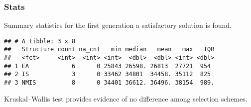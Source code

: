 \documentclass[]{book}
\newenvironment{Shaded}{\begin{snugshade}}{\end{snugshade}}
\newcommand{\CharTok}[1]{\textcolor[rgb]{0.31,0.60,0.02}{#1}}
\newcommand{\DataTypeTok}[1]{\textcolor[rgb]{0.13,0.29,0.53}{#1}}
\newcommand{\DecValTok}[1]{\textcolor[rgb]{0.00,0.00,0.81}{#1}}
\newcommand{\KeywordTok}[1]{\textcolor[rgb]{0.13,0.29,0.53}{\textbf{#1}}}
\newcommand{\NormalTok}[1]{#1}
\newcommand{\OperatorTok}[1]{\textcolor[rgb]{0.81,0.36,0.00}{\textbf{#1}}}
\newcommand{\OtherTok}[1]{\textcolor[rgb]{0.56,0.35,0.01}{#1}}
\newcommand{\StringTok}[1]{\textcolor[rgb]{0.31,0.60,0.02}{#1}}
\begin{document}
\hypertarget{stats-23}{%
\subsubsection{Stats}\label{stats-23}}

Summary statistics for the first generation a satisfactory solution is found.

\begin{Shaded}
\end{Shaded}

\begin{verbatim}
## # A tibble: 3 x 8
##   Structure count na_cnt   min median   mean   max   IQR
##   <fct>     <int>  <int> <int>  <dbl>  <dbl> <int> <dbl>
## 1 EA            6      0 25843 26598. 26813  27721  954 
## 2 IS            3      0 33462 34801  34458. 35112  825 
## 3 NMIS          8      0 34401 36612. 36496. 38154  989.
\end{verbatim}

Kruskal--Wallis test provides evidence of no difference among selection schemes.
\end{document}
